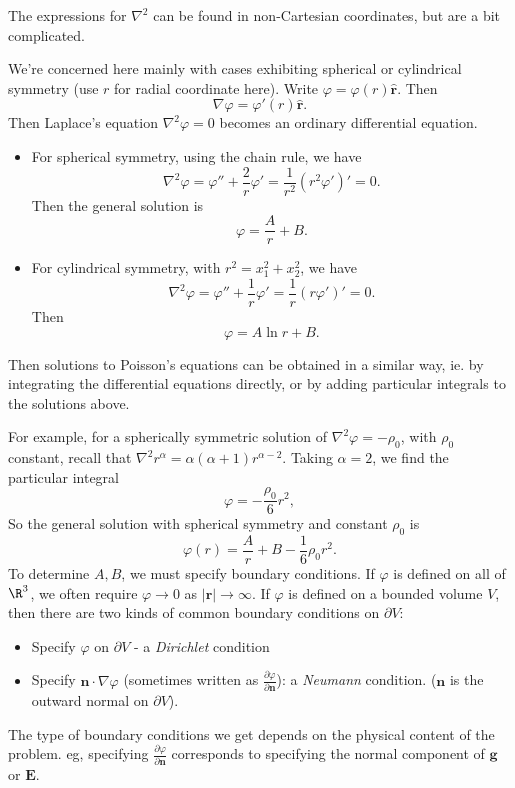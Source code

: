 \documentclass[a4paper]{article}
\begin{document}
The expressions for $\nabla^2$ can be found in non-Cartesian coordinates, but are a bit complicated.

We're concerned here mainly with cases exhibiting spherical or cylindrical symmetry (use $r$ for radial coordinate here). Write $\varphi = \varphi(r) \hat{\mathbf{r}}$. Then
\[
  \nabla \varphi = \varphi'(r)\hat{\mathbf{r}}.
\]
Then Laplace's equation $\nabla^2 \varphi = 0$ becomes an ordinary differential equation.
\begin{itemize}
  \item For spherical symmetry, using the chain rule, we have
    \[
      \nabla^2 \varphi = \varphi'' + \frac{2}{r}\varphi' = \frac{1}{r^2}(r^2\varphi')' = 0.
    \]
    Then the general solution is
    \[
      \varphi = \frac{A}{r} + B.
    \]
  \item For cylindrical symmetry, with $r^2 = x_1^2 + x_2^2$, we have
    \[
      \nabla^2 \varphi = \varphi'' + \frac{1}{r}\varphi' = \frac{1}{r}(r\varphi')' = 0.
    \]
    Then
    \[
      \varphi = A\ln r + B.
    \]
\end{itemize}
Then solutions to Poisson's equations can be obtained in a similar way, ie. by integrating the differential equations directly, or by adding particular integrals to the solutions above.

For example, for a spherically symmetric solution of $\nabla^2 \varphi = -\rho_0$, with $\rho_0$ constant, recall that $\nabla^2 r^\alpha = \alpha(\alpha + 1)r^{\alpha - 2}$. Taking $\alpha = 2$, we find the particular integral
\[
  \varphi = -\frac{\rho_0}{6}r^2,
\]
So the general solution with spherical symmetry and constant $\rho_0$ is
\[
  \varphi(r) = \frac{A}{r} + B - \frac{1}{6}\rho_0 r^2.
\]
To determine $A, B$, we must specify boundary conditions. If $\varphi$ is defined on all of $\R^3$, we often require $\varphi \to 0$ as $|\mathbf{r}| \to \infty$. If $\varphi$ is defined on a bounded volume $V$, then there are two kinds of common boundary conditions on $\partial V$:
\begin{itemize}
  \item Specify $\varphi$ on $\partial V$ - a \emph{Dirichlet} condition
  \item Specify $\mathbf{n}\cdot \nabla \varphi$ (sometimes written as $\frac{\partial \varphi}{\partial \mathbf{n}}$): a \emph{Neumann} condition. ($\mathbf{n}$ is the outward normal on $\partial V$).
\end{itemize}
The type of boundary conditions we get depends on the physical content of the problem. eg, specifying $\frac{\partial \varphi}{\partial \mathbf{n}}$ corresponds to specifying the normal component of $\mathbf{g}$ or $\mathbf{E}$.
\end{document}

